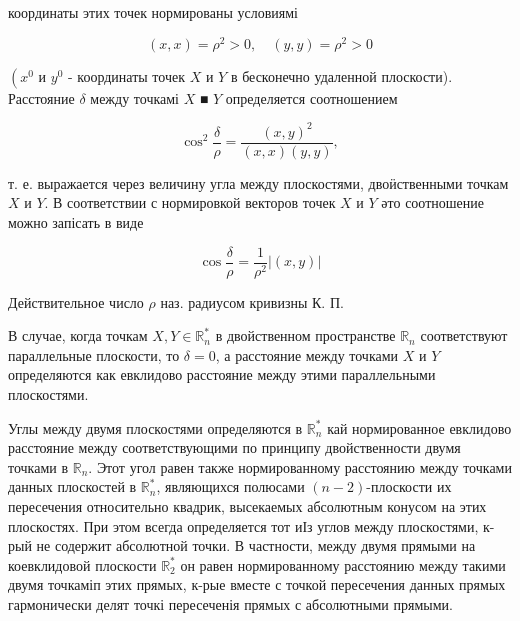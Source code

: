 \documentclass[10pt]{article}
\begin{document}
координаты этих точек нормированы условиямі



\[

(x, x)=\rho^{2}>0, \quad(y, y)=\rho^{2}>0

\]



$\left(x^{0}\right.$ и $y^{0}$ - координаты точек $X$ и $Y$ в бесконечно удаленной плоскости). Расстояние $\delta$ между точкамі $X$ ■ $Y$ определяется соотношением



\[

\cos ^{2} \frac{\delta}{\rho}=\frac{(x, y)^{2}}{(x, x)(y, y)},

\]



т. е. выражается через величину угла между плоскостями, двоӥственными точкам $X$ и $Y$. В соответствии с нормировкой векторов точек $X$ и $Y$ әто соотношение можно запісать в виде



\[

\cos \frac{\delta}{\rho}=\frac{1}{\rho^{2}}|(x, y)|

\]



Действительное число $\rho$ наз. радиусом кривизны К. П.



В случае, когда точкам $X, Y \in \mathbb{R}_{n}^{*}$ в двойственном пространстве $\mathbb{R}_{n}$ соответствуют параллельные плоскости, то $\delta=0$, а расстояние между точками $X$ и $Y$ определяются как евклидово расстояние между этими параллельными плоскостями.



Углы между двумя плоскостями определяются в $\mathbb{R}_{n}^{*}$ кай нормированное евклидово расстояние между соответствующими по принципу двойственности двумя точками в $\mathbb{R}_{n}$. Этот угол равен также нормированному расстоянию между точками данных плоскостей в $\mathbb{R}_{n}^{*}$, являющихся полюсами $(n-2)$-плоскости их пересечения относительно квадрик, высекаемых абсолютным конусом на этих плоскостях. При этом всегда определяется тот иІз углов между плоскостями, к-рый не содержит абсолютной точки. В частности, между двумя прямыми на коевклидовой плоскости $\mathbb{R}_{2}^{*}$ он равен нормированному расстоянию между такими двумя точкаміп этих прямых, к-рые вместе с точкой пересечения данных прямых гармонически делят точкі пересеченія прямых с абсолютными прямыми.
\end{document}

